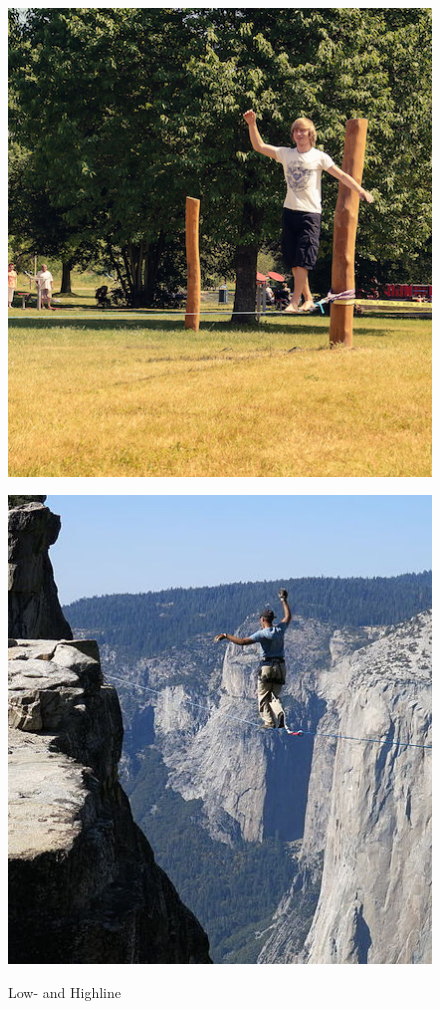 \begin{figure}[htb]
	\centering
	\begin{minipage}[t]{0.44\linewidth}
		\centering
		\includegraphics[width=0.94\linewidth]{Pictures/3_1_lowline}
		\label{fig:lowline}
	\end{minipage}
	\hfill
	\begin{minipage}[t]{0.44\linewidth}
		\centering
		\includegraphics[width=0.94\linewidth]{Pictures/3_1_highline2}
		\label{fig:highline}
	\end{minipage}
	\caption{Low- and Highline}
	\label{fig:lowAndHighline}
\end{figure}

